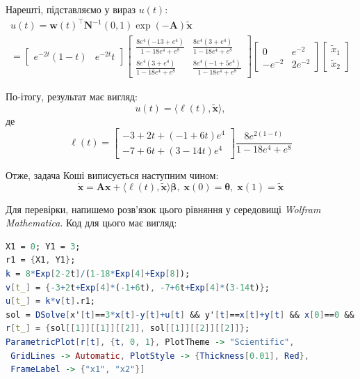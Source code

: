\documentclass[oneside,solution]{karazin-control-assign}
\begin{document}
Нарешті, підставляємо у вираз $u(t)$:
\begin{gather}
    u(t) = \mathbf{w}(t)^{\top}\boldsymbol{N}^{-1}(0,1)\exp(-\boldsymbol{A})\widetilde{\mathbf{x}} \nonumber \\
    = \begin{bmatrix}
        e^{-2t}(1-t) & e^{-2t}t
    \end{bmatrix}\begin{bmatrix}
        \frac{8e^4(-13+e^4)}{1-18e^4+e^8} & \frac{8e^4(3+e^4)}{1-18e^4+e^8} \\
        \frac{8e^4(3+e^4)}{1-18e^4+e^8} & \frac{8e^4(-1+5e^4)}{1-18e^4+e^8}
    \end{bmatrix}\begin{bmatrix}
        0 & e^{-2} \\ -e^{-2} & 2e^{-2}
    \end{bmatrix}\begin{bmatrix}
        \widetilde{x}_1 \\ \widetilde{x}_2
    \end{bmatrix}
\end{gather}

По-ітогу, результат має вигляд:
\begin{equation}
    u(t) = \langle\boldsymbol{\ell}(t),\widetilde{\mathbf{x}} \rangle,
\end{equation}
де
\begin{equation}
    \boldsymbol{\ell}(t) = \begin{bmatrix}
        -3+2t+(-1+6t)e^4 \\
        -7+6t+(3-14t)e^4
    \end{bmatrix}\frac{8e^{2(1-t)}}{1-18e^4+e^8}
\end{equation}

Отже, задача Коші виписується наступним чином:
\begin{equation}
    \dot{\mathbf{x}} = \boldsymbol{A}\mathbf{x} + \langle \boldsymbol{\ell}(t),\widetilde{\mathbf{x}}\rangle \boldsymbol{\beta}, \; \mathbf{x}(0) = \boldsymbol{\theta}, \; \mathbf{x}(1) = \widetilde{\mathbf{x}}
\end{equation}

Для перевірки, напишемо розв'язок цього рівняння у середовищі \textit{Wolfram Mathematica}. Код для цього має вигляд:
\begin{lstlisting}[language=Mathematica]
X1 = 0; Y1 = 3;
r1 = {X1, Y1};
k = 8*Exp[2-2t]/(1-18*Exp[4]+Exp[8]);
v[t_] = {-3+2t+Exp[4]*(-1+6t), -7+6t+Exp[4]*(3-14t)};
u[t_] = k*v[t].r1;
sol = DSolve[x'[t]==3*x[t]-y[t]+u[t] && y'[t]==x[t]+y[t] && x[0]==0 && y[0]==0, {x[t],y[t]}, t];
r[t_] = {sol[[1]][[1]][[2]], sol[[1]][[2]][[2]]};
ParametricPlot[r[t], {t, 0, 1}, PlotTheme -> "Scientific", 
 GridLines -> Automatic, PlotStyle -> {Thickness[0.01], Red}, 
 FrameLabel -> {"x1", "x2"}]
\end{lstlisting}
\end{document}
